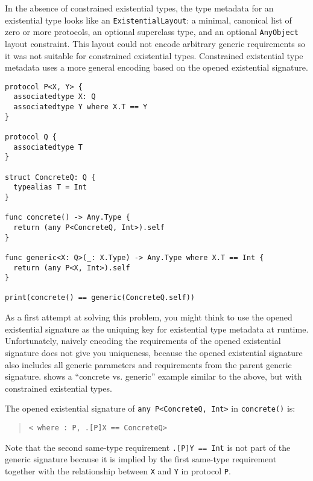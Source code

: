 \documentclass[../generics]{subfiles}
\begin{document}
In the absence of constrained existential types, the type metadata for an existential type looks like an \texttt{ExistentialLayout}: a minimal, canonical list of zero or more protocols, an optional superclass type, and an optional \texttt{AnyObject} layout constraint. This layout could not encode arbitrary generic requirements so it was not suitable for constrained existential types. Constrained existential type metadata uses a more general encoding based on the opened existential signature.

\begin{listing}\label{generalizationexample}
\begin{Verbatim}
protocol P<X, Y> {
  associatedtype X: Q
  associatedtype Y where X.T == Y
}

protocol Q {
  associatedtype T
}

struct ConcreteQ: Q {
  typealias T = Int
}

func concrete() -> Any.Type {
  return (any P<ConcreteQ, Int>).self
}

func generic<X: Q>(_: X.Type) -> Any.Type where X.T == Int {
  return (any P<X, Int>).self
}

print(concrete() == generic(ConcreteQ.self))
\end{Verbatim}
\end{listing}

As a first attempt at solving this problem, you might think to use the opened existential signature as the uniquing key for existential type metadata at runtime. Unfortunately, naively encoding the requirements of the opened existential signature does not give you uniqueness, because the opened existential signature also includes all generic parameters and requirements from the parent generic signature.  shows a ``concrete vs. generic'' example similar to the above, but with constrained existential types.

The opened existential signature of \texttt{any P<ConcreteQ, Int>} in \texttt{concrete()} is:
\begin{quote}
\texttt{< where :\ P, .[P]X == ConcreteQ>}
\end{quote}
Note that the second same-type requirement \texttt{.[P]Y == Int} is not part of the generic signature because it is implied by the first same-type requirement together with the relationship between \texttt{X} and \texttt{Y} in protocol \texttt{P}.
\end{document}
